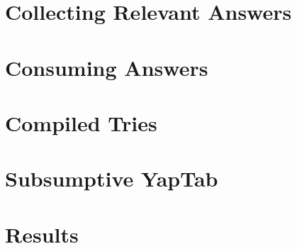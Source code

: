 \section{Collecting Relevant Answers}

\section{Consuming Answers}

\section{Compiled Tries}

\section{Subsumptive YapTab}

\section{Results}